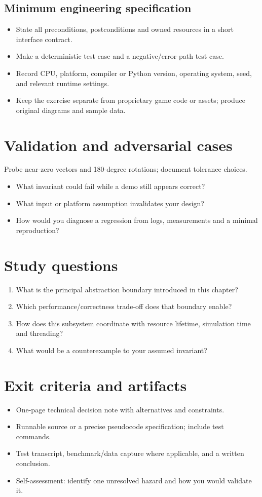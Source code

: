 \documentclass[11pt,letterpaper]{article}
\begin{document}
\subsection{Minimum engineering specification}
\begin{itemize}
\item State all preconditions, postconditions and owned resources in a short interface contract.
\item Make a deterministic test case and a negative/error-path test case.
\item Record CPU, platform, compiler or Python version, operating system, seed, and relevant runtime settings.
\item Keep the exercise separate from proprietary game code or assets; produce original diagrams and sample data.
\end{itemize}
\section{Validation and adversarial cases}
Probe near-zero vectors and 180-degree rotations; document tolerance choices.

\begin{itemize}
\item What invariant could fail while a demo still appears correct?
\item What input or platform assumption invalidates your design?
\item How would you diagnose a regression from logs, measurements and a minimal reproduction?
\end{itemize}
\section{Study questions}
\begin{enumerate}
\item What is the principal abstraction boundary introduced in this chapter?
\item Which performance/correctness trade-off does that boundary enable?
\item How does this subsystem coordinate with resource lifetime, simulation time and threading?
\item What would be a counterexample to your assumed invariant?
\end{enumerate}
\section{Exit criteria and artifacts}
\begin{itemize}
\item One-page technical decision note with alternatives and constraints.
\item Runnable source or a precise pseudocode specification; include test commands.
\item Test transcript, benchmark/data capture where applicable, and a written conclusion.
\item Self-assessment: identify one unresolved hazard and how you would validate it.
\end{itemize}
\end{document}

